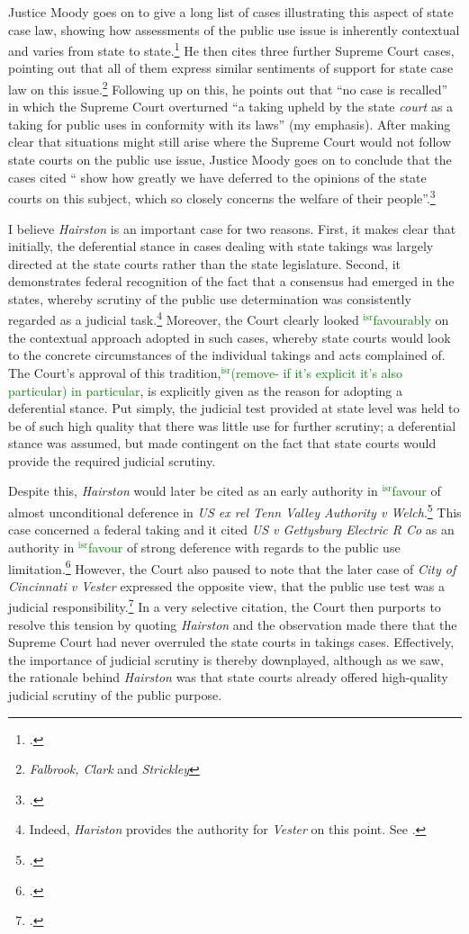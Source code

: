 \documentclass[12pt,a4paper]{book} %
\newcommand{\isr}[1]{\textcolor{green}{$^{\textrm{isr}}${#1}}}
\begin{document}
Justice Moody goes on to give a long list of cases illustrating this aspect of state case law, showing how assessments of the public use issue is inherently contextual and varies from state to state.\footcite[607]{hairston08} He then cites three further Supreme Court cases, pointing out that all of them express similar sentiments of support for state case law on this issue.\footnote{{\it Falbrook, Clark} and {\it Strickley}} Following up on this, he points out that ``no case is recalled'' in which the Supreme Court overturned ``a taking upheld by the state {\it court} as a taking for public uses in conformity with its laws'' (my emphasis). After making clear that situations might still arise where the Supreme Court would not follow state courts on the public use issue, Justice Moody goes on to conclude that the cases cited `` show how greatly we have deferred to the opinions of the state courts on this subject, which so closely concerns the welfare of their people''.\footcite[606]{hairston08}

I believe {\it Hairston} is an important case for two reasons. First, it makes clear that initially, the deferential stance in cases dealing with state takings was largely directed at the state courts rather than the state legislature. Second, it demonstrates federal recognition of the fact that a consensus had emerged in the states, whereby scrutiny of the public use determination was consistently regarded as a judicial task.\footnote{Indeed, {\it Hariston} provides the authority for {\it Vester} on this point. See \cite[606]{vester30}.} Moreover, the Court clearly looked \isr{favourably} on the contextual approach adopted in such cases, whereby state courts would look to the concrete circumstances of the individual takings and acts complained of. The Court's approval of this tradition,\isr{(remove- if it's explicit it's also particular) in particular}, is explicitly given as the reason for adopting a deferential stance. Put simply, the judicial test provided at state level was held to be of such high quality that there was little use for further scrutiny; a deferential stance was assumed, but made contingent on the fact that state courts would provide the required judicial scrutiny.

Despite this, {\it Hairston} would later be cited as an early authority in \isr{favour} of almost unconditional deference in {\it US ex rel Tenn Valley Authority v Welch}.\footcite[552]{welch46} This case concerned a federal taking and it cited {\it US v Gettysburg Electric R Co} as an authority in \isr{favour} of strong deference with regards to the public use limitation.\footcite{gettysburg96} However, the Court also paused to note that the later case of {\it City of Cincinnati v Vester} expressed the opposite view, that the public use test was a judicial responsibility.\footcite{vester30} In a very selective citation, the Court then purports to resolve this tension by quoting {\it Hairston} and the observation made there that the Supreme Court had never overruled the state courts in takings cases. Effectively, the importance of judicial scrutiny is thereby downplayed, although as we saw, the rationale behind {\it Hairston} was that state courts already offered high-quality judicial scrutiny of the public purpose.
\end{document}
